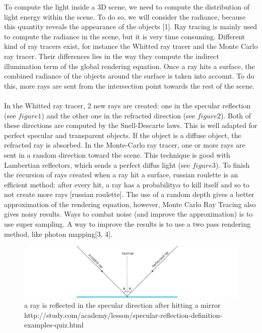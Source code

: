 \documentclass[12pt]{article}
\numberwithin{equation}{section}
\begin{document}
To compute the light inside a 3D scene, we need to compute the distribution of light energy within the scene. To do so, we will consider the radiance, because this quantity reveals the appearance of the objects [1]. Ray tracing is mainly used to compute the radiance in the scene, but it is very time consuming. Different kind of ray tracers exist, for instance the Whitted ray tracer and the Monte Carlo ray tracer. Their differences lies in the way they compute the indirect illumination term of the global rendering equation. Once a ray hits a surface, the combined radiance of the objects around the surface is taken into account. To do this, more rays are sent from the intersection point towards the rest of the scene.\\
\\
In the Whitted ray tracer, 2 new rays are created: one in the specular reflection (see $figure 1$) and the other one in the refracted direction (see $figure 2$). Both of these directions are computed by the Snell-Descarte laws. This is well adapted for perfect specular and transparent objects. If the object is a diffuse object, the refracted ray is absorbed.
In the Monte-Carlo ray tracer, one or more rays are sent in a random direction toward the scene. This technique is good with Lambertian reflectors, which sends a perfect diffus light (see $figure 3$). To finish the recursion of rays created when a ray hit a surface, russian roulette is an efficient method: after every hit, a ray has a probability$\alpha$ to kill itself and so to not create more rays [russian roulette]. The use of a random depth gives a better approximation of the rendering equation, however, Monte Carlo Ray Tracing also gives noisy results. Ways to combat noise (and improve the approximation) is to use super sampling. A way to improve the results is to use a two pass rendering method, like photon mapping[3, 4].\\

\begin{figure}
  \begin{center}
    \includegraphics[scale=0.6]{425px-ray_optics_diagram_incidence_reflection_and_refraction_svg_wide.png}
    \caption{a ray is reflected in the specular direction after hitting a mirror\\http://study.com/academy/lesson/specular-reflection-definition-examples-quiz.html}
    \label{fig:1}
  \end{center}
\end{figure}
\end{document}
